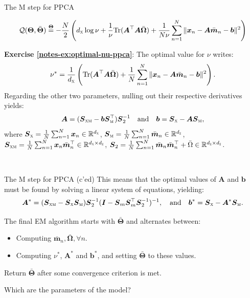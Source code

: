 \documentclass{beamer}
\newcommand{\bs}[1]{\boldsymbol{#1}}
\newcommand{\exercise}[2]{\noindent\colorbox{blue!10}{\parbox{0.995\textwidth}{\textbf{Exercise \ref{notes-ex:#1}}: #2}}\\}
\begin{document}
\begin{frame}{The M step for PPCA}

{\small \begin{align*}
 \mathcal{Q}(\bs{\Theta},\bar{\bs{\Theta}}) \stackrel{\bs{\Theta}}{=} -\frac{N}{2}\left(d_{\textsc{x}}\log\nu  + \frac{1}{\nu}\textrm{Tr}(\bs{A}^\top\bs{A}\bar{\bs{\Omega}}) + \frac{1}{N\nu}\sum_{n=1}^N\|\bs{x}_n-\bs{A}\bar{\bs{m}}_n-\bs{b}\|^2\right)
\end{align*}}
  \exercise{optimal-nu-ppca}{
 The optimal value for $\nu$ writes:
 \[
  \nu^* = \frac{1}{d_{\textsc{x}}}\left(\textrm{Tr}(\bs{A}^\top\bs{A}\bar{\bs{\Omega}}) + \frac{1}{N} \sum_{n=1}^N\|\bs{x}_n-\bs{A}\bar{\bs{m}}_n-\bs{b}\|^2\right).
 \]\pause
 Regarding the other two parameters, nulling out their respective derivatives yields:
 \begin{align*}
  \bs{A} = (\bs{S}_{\textsc{xm}}-\bs{b}\bs{S}_{\textsc{m}}^\top)\bs{S}^{-1}_2 \quad\text{and}\quad \bs{b} = \bs{S}_{\textsc{x}}-\bs{A}\bs{S}_{\textsc{m}},
 \end{align*}
where $\bs{S}_{\textsc{x}}=\frac{1}{N}\sum_{n=1}^N\bs{x}_n\in\mathbb{R}^{d_{\textsc{x}}}$, $\bs{S}_{\textsc{m}}=\frac{1}{N}\sum_{n=1}^N \bar{\bs{m}}_n\in\mathbb{R}^{d_{\textsc{z}}}$, $\bs{S}_{\textsc{xm}} = \frac{1}{N}\sum_{n=1}^N \bs{x}_n\bar{\bs{m}}_n^\top\in\mathbb{R}^{d_{\textsc{x}}\times d_{\textsc{z}}}$, $\bs{S}_2=\frac{1}{N}\sum_{n=1}^N \bar{\bs{m}}_n\bar{\bs{m}}_n^\top + \bar{\Omega}\in\mathbb{R}^{d_{\textsc{z}}\times d_{\textsc{z}}}$. 
}
\end{frame}

\begin{frame}{The M step for PPCA (c'ed)}
 This means that the optimal values of $\bs{A}$ and $\bs{b}$ must be found by solving a linear system of equations, yielding:
\[
 \bs{A}^* = (\bs{S}_{\textsc{xm}}-\bs{S}_{\textsc{x}}\bs{S}_{\textsc{m}})\bs{S}_2^{-1}(\bs{I}-\bs{S}_m\bs{S}_m^\top\bs{S}_2^{-1})^{-1}, \quad\text{and}\quad \bs{b}^* = \bs{S}_{\textsc{x}}-\bs{A}^*\bs{S}_{\textsc{m}}.
\]\vspace{3mm}

The final EM algorithm starts with $\bar{\bs{\Theta}}$ and alternates between:
\begin{itemize}
 \item Computing $\bar{\bs{m}}_n,\bar{\bs{\Omega}}, \forall n$.
 \item Computing $\nu^*$, $\bs{A}^*$ and $\bs{b}^*$, and setting $\bar{\bs{\Theta}}$ to these values.
\end{itemize}
Return $\bar{\bs{\Theta}}$ after some convergence criterion is met.\vspace{6mm}

Which are the parameters of the model?

\end{frame}
\end{document}
